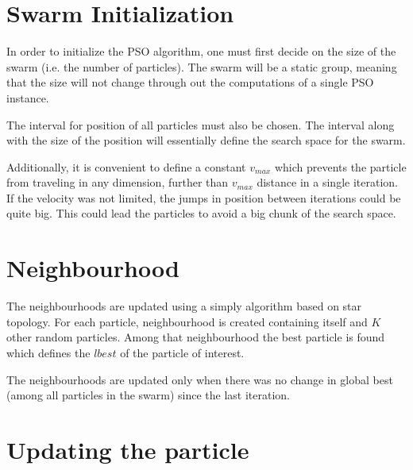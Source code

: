 \documentclass{mini}
\begin{document}


\section{Swarm Initialization}
In order to initialize the PSO algorithm, one must first decide on the size of the swarm (i.e. the number of particles). The swarm will be a static group, meaning that the size will not change through out the computations of a single PSO instance.

The interval for position of all particles must also be chosen. The interval along with the size of the position will essentially define the search space for the swarm.

Additionally, it is convenient to define a constant $v_{max}$ which prevents the particle from traveling in any dimension, further than $v_{max}$ distance in a single iteration. If the velocity was not limited, the jumps in position between iterations could be quite big. This could lead the particles to avoid a big chunk of the search space.


\section{Neighbourhood}

The neighbourhoods are updated using a simply algorithm based on star topology.
For each particle, neighbourhood is created containing itself and $K$ other random particles. Among that neighbourhood the best particle is found which defines the $lbest$ of the particle of interest.

The neighbourhoods are updated only when there was no change in global best (among all particles in the swarm) since the last iteration.


\section{Updating the particle}
\end{document}

